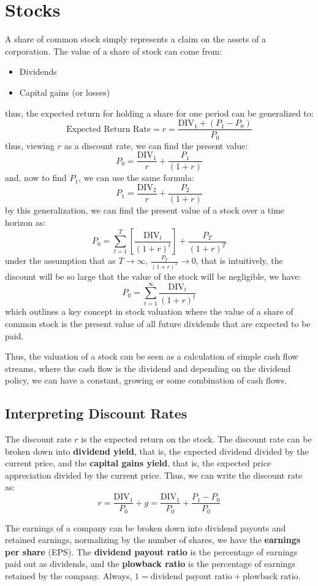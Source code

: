 \section{Stocks}
A share of common stock simply represents a claim on the assets of a corporation. The value of a share of stock can come from:
\begin{itemize}
	\item Dividends
	\item Capital gains (or losses)
\end{itemize}
thus, the expected return for holding a share for one period can be generalized to:
$$
\text{Expected Return Rate}= r = \frac{\text{DIV}_1 + (P_1-P_0)}{P_0}
$$
thus, viewing $r$ as a discount rate, we can find the present value:
$$
P_0 = \frac{\text{DIV}_1}{r} + \frac{P_1}{(1 + r)}
$$
and, now to find $P_1$, we can use the same formula:
$$
P_1 = \frac{\text{DIV}_2}{r} + \frac{P_2}{(1 + r)}
$$
by this generalization, we can find the present value of a stock over a time horizon as:
$$
P_0 = \sum_{t=1}^{T} [\frac{\text{DIV}_t}{(1 + r)^t}]+ \frac{P_T}{(1 + r)^T}
$$
under the assumption that as $T \to \infty$, $\frac{P_T}{(1 + r)^T} \to 0$, that is intuitively, the discount will be so large that the value of the stock will be negligible, we have:
$$
P_0 = \sum_{t=1}^{\infty} \frac{\text{DIV}_t}{(1 + r)^t}
$$
which outlines a key concept in stock valuation where the value of a share of common stock is the present value of all future dividends that are expected to be paid.

Thus, the valuation of a stock can be seen as a calculation of simple cash flow streams, where the cash flow is the dividend and depending on the dividend policy, we can have a constant, growing or some combination of cash flows.


\subsection{Interpreting Discount Rates}
The discount rate $r$ is the expected return on the stock. The discount rate can be broken down into \textbf{dividend yield}, that is, the expected dividend divided by the current price, and the \textbf{capital gains yield}, that is, the expected price appreciation divided by the current price. Thus, we can write the discount rate as:
$$
r = \frac{\text{DIV}_1}{P_0} + g = \frac{\text{DIV}_1}{P_0} + \frac{P_1 - P_0}{P_0}
$$

The earnings of a company can be broken down into dividend payouts and retained earnings, normalizing by the number of shares, we have the \textbf{earnings per share} (EPS). The \textbf{dividend payout ratio} is the percentage of earnings paid out as dividends, and the \textbf{plowback ratio} is the percentage of earnings retained by the company. Always, $1 = \text{dividend payout ratio} + \text{plowback ratio}$.

